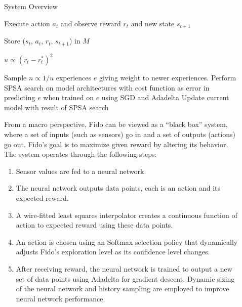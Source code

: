 \documentclass[final]{beamer}
\newlength{\sepwid}
\newlength{\onecolwid}
\newlength{\twocolwid}
\begin{document}
\begin{frame}[t]
\begin{columns}[t]
\begin{column}{\onecolwid}
\begin{block}{System Overview}
\begin{algorithm}[H]
\begin{algorithmic}[1]
			  \State Execute action $a_t$ and observe reward $r_t$ and new state $s_{t+1}$

			  \State Store ($s_t$, $a_t$, $r_t$, $s_{t+1}$) in $M$

			  \State $u \propto (r_t-r_t^*)^2$

			  \State Sample $n \propto {1/u}$ experiences $e$ giving weight to newer experiences.
			  \State Perform SPSA search on model architectures with cost function as error in predicting $e$ when trained on $e$ using SGD and Adadelta
			  \State Update current model with result of SPSA search
			\EndWhile
		\end{algorithmic}
		\end{algorithm}

		From a macro perspective, Fido can be viewed as a ``black box'' system, where a set of inputs (such as sensors) go in and a set of outputs (actions) go out.  Fido's goal is to maximize given reward by altering its behavior.  The system operates through the following steps:

		\begin{enumerate}
			\item Sensor values are fed to a neural network.
			\item The neural network outputs data points, each is an action and its expected reward.
			\item A wire-fitted least squares interpolator creates a continuous function of action to expected reward using these data points.
			\item An action is chosen using an Softmax selection policy that dynamically adjusts Fido's exploration level as its confidence level changes.
			\item After receiving reward, the neural network is trained to output a new set of data points using Adadelta for gradient descent. Dynamic sizing of the neural network and history sampling are employed to improve neural network performance.
		\end{enumerate}
	\end{block}

\end{column}

\begin{column}{\sepwid}\end{column}

\begin{column}{\twocolwid}

\vspace{-1.65cm}


\end{column}
\end{columns}
\end{frame}
\end{document}
